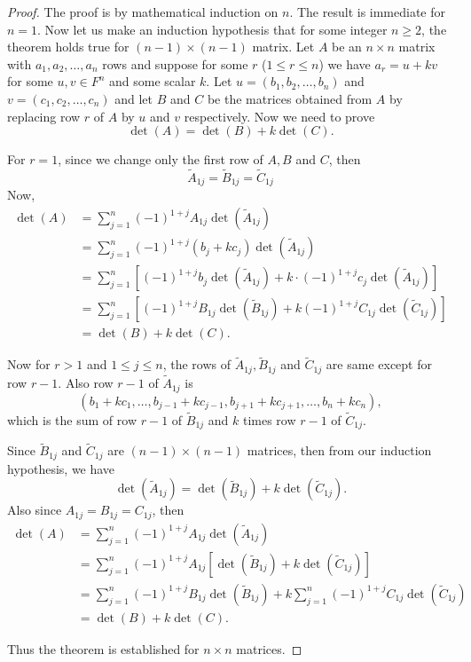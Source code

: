 \documentclass[12pt, a4paper]{article}
\theoremstyle{definition}
\theoremstyle{remark}
\begin{document}
    \begin{proof}
    The proof is by mathematical induction on $n$. The result is immediate for $n=1$. Now let us make an induction hypothesis that for some integer $n \ge 2$, the theorem holds true for $(n-1) \times (n-1)$ matrix. Let $A$ be an $n \times n$ matrix with $a_1, a_2, \dots, a_n$ rows and suppose for some $r$ ($1 \le r \le n$) we have $a_r = u + kv$ for some $u, v \in F^n$ and some scalar $k$. Let $u = (b_1, b_2, \dots, b_n)$ and $v = (c_1, c_2, \dots, c_n)$ and let $B$ and $C$ be the matrices obtained from $A$ by replacing row $r$ of $A$ by $u$ and $v$ respectively. Now we need to prove
    \[
    \det(A) = \det(B) + k \det(C).
    \]

    For $r = 1$, since we change only the first row of $A, B$ and $C$, then
    \[
    \widetilde{A}_{1j} = \widetilde{B}_{1j} = \widetilde{C}_{1j}
    \]
    Now,
    \begin{align*}
    \det(A) &= \sum_{j=1}^{n} (-1)^{1+j} A_{1j} \det(\widetilde{A}_{1j}) \\
    &= \sum_{j=1}^{n} (-1)^{1+j} (b_j + k c_j) \det(\widetilde{A}_{1j}) \\
    &= \sum_{j=1}^{n} \left[ (-1)^{1+j} b_j \det(\widetilde{A}_{1j}) + k \cdot (-1)^{1+j} c_j \det(\widetilde{A}_{1j}) \right] \\
    &= \sum_{j=1}^{n} \left[ (-1)^{1+j} B_{1j} \det(\widetilde{B}_{1j}) + k (-1)^{1+j} C_{1j} \det(\widetilde{C}_{1j}) \right] \\
    &= \det(B) + k \det(C).
    \end{align*}

    Now for $r > 1$ and $1 \le j \le n$, the rows of $\widetilde{A}_{1j}, \widetilde{B}_{1j}$ and $\widetilde{C}_{1j}$ are same except for row $r-1$. Also row $r-1$ of $\widetilde{A}_{1j}$ is
    \[
    (b_1 + k c_1, \dots, b_{j-1} + k c_{j-1}, b_{j+1} + k c_{j+1}, \dots, b_n + k c_n),
    \]
    which is the sum of row $r-1$ of $\widetilde{B}_{1j}$ and $k$ times row $r-1$ of $\widetilde{C}_{1j}$.

    Since $\widetilde{B}_{1j}$ and $\widetilde{C}_{1j}$ are $(n-1) \times (n-1)$ matrices, then from our induction hypothesis, we have
    \[
    \det(\widetilde{A}_{1j}) = \det(\widetilde{B}_{1j}) + k \det(\widetilde{C}_{1j}).
    \]
    Also since $A_{1j} = B_{1j} = C_{1j}$, then
    \begin{align*}
    \det(A) &= \sum_{j=1}^{n} (-1)^{1+j} A_{1j} \det(\widetilde{A}_{1j}) \\
    &= \sum_{j=1}^{n} (-1)^{1+j} A_{1j} \left[ \det(\widetilde{B}_{1j}) + k \det(\widetilde{C}_{1j}) \right] \\
    &= \sum_{j=1}^{n} (-1)^{1+j} B_{1j} \det(\widetilde{B}_{1j}) + k \sum_{j=1}^{n} (-1)^{1+j} C_{1j} \det(\widetilde{C}_{1j}) \\
    &= \det(B) + k \det(C).
    \end{align*}

    Thus the theorem is established for $n \times n$ matrices.
    \end{proof}
\end{document}
